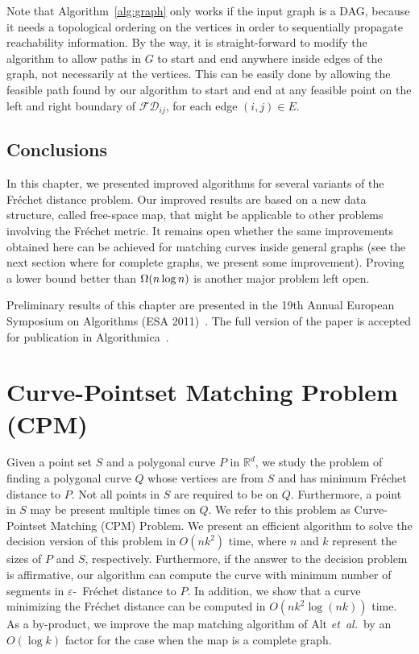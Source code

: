 \documentclass[12pt]{dalthesis}
\newcommand{\IR}{\ensuremath{\mathbb{R}}}
\newcommand{\eps}{\varepsilon}
\newcommand{\bigOmega}{{\rm\Omega}}
\newcommand{\etal}{{\em et~al.\/}}
\newcommand{\Frechet}{Fr\'echet }
\newcommand{\fs}{free-space }
\newcommand{\FD}{\mathscr {FD}}
\newcommand{\pset}{S}
\begin{document}
Note that Algorithm~\ref{alg:graph} only works if the input graph is a DAG,
because it needs a topological ordering on the vertices in order to 
sequentially propagate reachability information.  
By the way, it is straight-forward 
to modify the algorithm to allow paths in $G$
to start and end anywhere inside edges of the graph, 
not necessarily at the vertices. 
This can be easily done by allowing 
the feasible path found by our algorithm
to start and end at any feasible point 
on the left and right boundary of $\FD_{ij}$,
for each edge $(i,j) \in E$.





\section{Conclusions} \label{sec:concl}

In this chapter, we presented improved algorithms
for several variants of the \Frechet distance problem.
Our improved results are based on a new data structure, called \fs map,
that might be applicable to other problems involving the \Frechet metric.
It remains open whether the same improvements obtained here
can be achieved for matching curves inside general graphs (see the next section where for 
complete graphs, we present some 
improvement).  
Proving a lower bound better than $\bigOmega(n \log n)$ 
is another major problem left open.


Preliminary results of this chapter 
are presented in the 
19th Annual European Symposium on Algorithms (ESA 2011)~\cite{oursESA2011}.
The full version of the paper is accepted 
for publication in Algorithmica~\cite{oursPartialAlgorithmica}.


\clearpage{}

\clearpage{}\newcommand{\re}{\ell}


\chapter{Curve-Pointset Matching Problem (CPM) }
\label{ch:StayClose}

	Given a point set $S$ and a polygonal curve $P$ in $\IR^d$,
	we study the problem of finding a polygonal curve $Q$ whose vertices are from $S$
	and has minimum \Frechet distance to $P$. 
	Not all points in $\pset$ are required to be on 
	$Q$. Furthermore, a point in $\pset$ may be present multiple times on  $Q$. 
	We refer to this problem as  
	Curve-Pointset Matching (CPM) Problem.
	We present an efficient algorithm to solve the decision version 
	of this problem in $O(nk^2)$ time,
	where $n$ and $k$ represent the sizes of $P$ and $S$, respectively.
	Furthermore, if the answer to the decision problem is affirmative, 
	our algorithm can compute the curve with minimum number of segments 
	in $\eps$-~\Frechet distance to $P$.	
	In addition, we show that a curve minimizing the \Frechet distance can be computed in 
	$O(nk^2 \log(nk))$ time.
	As a by-product, we improve the map matching algorithm of Alt \etal\ 
	by an $O(\log k)$ factor for the case when the map is a complete graph.
\end{document}
